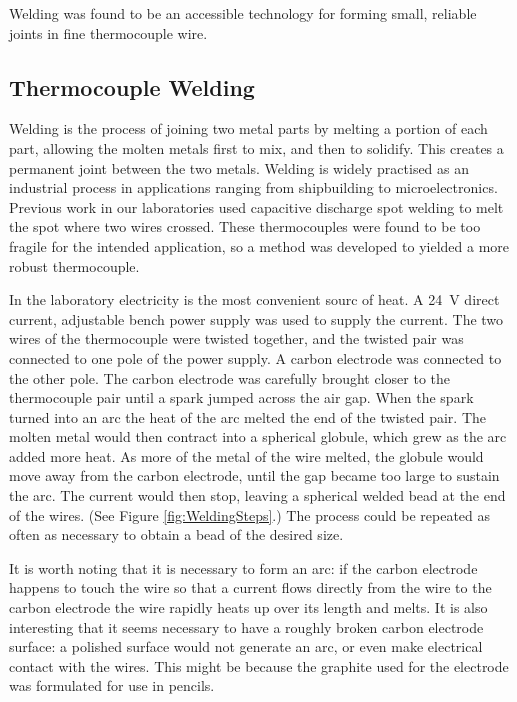 Welding was found to be an accessible technology for forming small, reliable
joints in fine thermocouple wire.

\subsection{Thermocouple Welding}

Welding is the process of joining two metal parts by melting a portion of each
part, allowing the molten metals first to mix, and then to solidify. This
creates a permanent joint between the two metals. Welding is widely practised as
an industrial process in applications ranging from shipbuilding to
microelectronics. Previous work in our laboratories used capacitive discharge
spot welding to melt the spot where two wires crossed. These thermocouples were
found to be too fragile for the intended application, so a method was developed
to yielded a more robust thermocouple.

In the laboratory electricity is the most convenient sourc of heat. A
\SI{24}{\volt} direct current, adjustable bench power supply was used to supply
the current. The two wires of the thermocouple were twisted together, and the
twisted pair was connected to one pole of the power supply. A carbon electrode
was connected to the other pole. The carbon electrode was carefully brought
closer to the thermocouple pair until a spark jumped across the air gap. When
the spark turned into an arc the heat of the arc melted the end of the twisted
pair. The molten metal would then contract into a spherical globule, which grew
as the arc added more heat. As more of the metal of the wire melted, the globule
would move away from the carbon electrode, until the gap became too large to
sustain the arc. The current would then stop, leaving a spherical welded bead at
the end of the wires. (See Figure \ref{fig:WeldingSteps}.) The process could be
repeated as often as necessary to obtain a bead of the desired size.

It is worth noting that it is necessary to form an arc: if the carbon electrode
happens to touch the wire so that a current flows directly from the wire to the
carbon electrode the wire rapidly heats up over its length and melts. It is also
interesting that it seems necessary to have a roughly broken carbon electrode
surface: a polished surface would not generate an arc, or even make electrical
contact with the wires. This might be because the graphite used for the
electrode was formulated for use in pencils.

